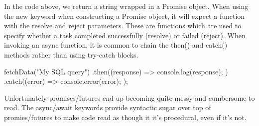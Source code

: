 \documentclass{article}
\begin{document}
In the code above, we return a string wrapped in a Promise object. When using the new keyword when constructing
a Promise object, it will expect a function with the resolve and reject parameters. These are functions which
are used to specify whether a task completed successfully (resolve) or failed (reject). When invoking an async
function, it is common to chain the then() and catch() methods rather than using try-catch blocks.

\begin{tslst}

fetchData("My SQL query")
    .then((response) => {
        console.log(response);
    })
    .catch((error) => {
        console.error(error);
    });

\end{tslst}

Unfortunately promises/futures end up becoming quite messy and cumbersome to read. The async/await keywords
provide syntactic sugar over top of promies/futures to make code read as though it it's procedural, even if
it's not.
\end{document}
